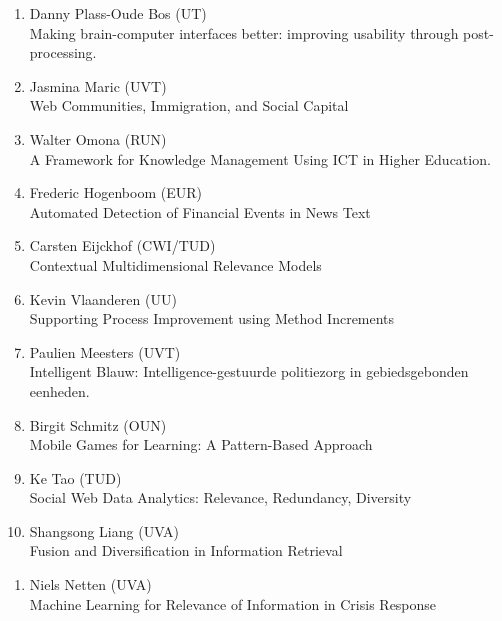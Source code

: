\begin{multicols}{2}
\begin{scriptsize}
\begin{enumerate}[label=\textbf{2014-\arabic*},leftmargin=0cm,itemindent=1.15cm,labelwidth=\itemindent,labelsep=0cm,align=left,noitemsep]
\item Danny Plass-Oude Bos (UT)\\
	Making brain-computer interfaces better: improving usability through post-processing.

\item Jasmina Maric (UVT)\\
	Web Communities, Immigration, and Social Capital
	
\item Walter Omona (RUN)\\
	A Framework for Knowledge Management Using ICT in Higher Education.

\item Frederic Hogenboom (EUR)\\
	Automated Detection of Financial Events in News Text

\item Carsten Eijckhof (CWI/TUD)\\
	Contextual Multidimensional Relevance Models

\item Kevin Vlaanderen (UU)\\
	Supporting Process Improvement using Method Increments 
	
\item Paulien Meesters (UVT)\\
	Intelligent Blauw: Intelligence-gestuurde politiezorg in gebiedsgebonden eenheden. 		

\item Birgit Schmitz (OUN)\\
	Mobile Games for Learning: A Pattern-Based Approach 

\item Ke Tao (TUD)\\
	Social Web Data Analytics: Relevance, Redundancy, Diversity

\item Shangsong Liang (UVA)\\
	Fusion and Diversification in Information Retrieval 	
\end{enumerate}

\begin{enumerate}[label=\textbf{2015-\arabic*},leftmargin=0cm,itemindent=1.15cm,labelwidth=\itemindent,labelsep=0cm,align=left,noitemsep]

\item Niels Netten (UVA) \\
	Machine Learning for Relevance of Information in Crisis Response 	


\end{enumerate}
\end{scriptsize}
\end{multicols}
